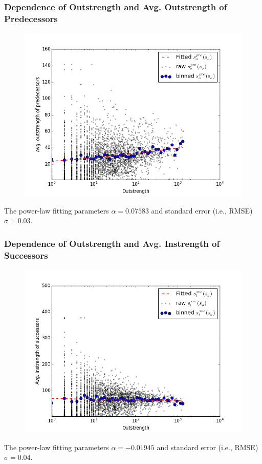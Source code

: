 \documentclass{beamer}
\begin{document}
\begin{frame}
\frametitle{Dependence of Outstrength and Avg. Outstrength of Predecessors}
\begin{figure}
\includegraphics[width=0.8\linewidth]{figs/pre_out_out_s.png}
\end{figure}
\small{The power-law fitting parameters $\alpha=0.07583$ and standard error (i.e., RMSE) $\sigma=0.03$.}
\end{frame}

\begin{frame}
\frametitle{Dependence of Outstrength and Avg. Instrength of Successors}
\begin{figure}
\includegraphics[width=0.8\linewidth]{figs/suc_in_out_s.png}
\end{figure}
\small{The power-law fitting parameters $\alpha=-0.01945$ and standard error (i.e., RMSE) $\sigma=0.04$.}
\end{frame}
\end{document}
